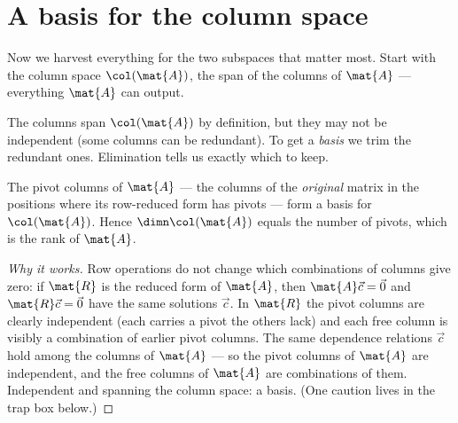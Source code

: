 \section{A basis for the column space}
\label{ch14:colbasis}

Now we harvest everything for the two subspaces that matter most. Start with the
column space $\col(\mat{A})$, the span of the columns of $\mat{A}$ --- everything
$\mat{A}$ can output.

The columns span $\col(\mat{A})$ by definition, but they may not be independent
(some columns can be redundant). To get a \emph{basis} we trim the redundant ones.
Elimination tells us exactly which to keep.

\begin{theorem}
\label{ch14:thm-colbasis}
The pivot columns of $\mat{A}$ --- the columns of the \emph{original} matrix in
the positions where its row-reduced form has pivots --- form a basis for
$\col(\mat{A})$. Hence $\dimn \col(\mat{A})$ equals the number of pivots, which is
the rank of $\mat{A}$.
\end{theorem}

\begin{proof}[Why it works]
Row operations do not change which combinations of columns give zero: if $\mat{R}$
is the reduced form of $\mat{A}$, then $\mat{A}\vec{c}=\vec{0}$ and
$\mat{R}\vec{c}=\vec{0}$ have the same solutions $\vec{c}$. In $\mat{R}$ the
pivot columns are clearly independent (each carries a pivot the others lack) and
each free column is visibly a combination of earlier pivot columns. The same
dependence relations $\vec{c}$ hold among the columns of $\mat{A}$ --- so the
pivot columns of $\mat{A}$ are independent, and the free columns of $\mat{A}$ are
combinations of them. Independent and spanning the column space: a basis. (One
caution lives in the trap box below.)
\end{proof}

